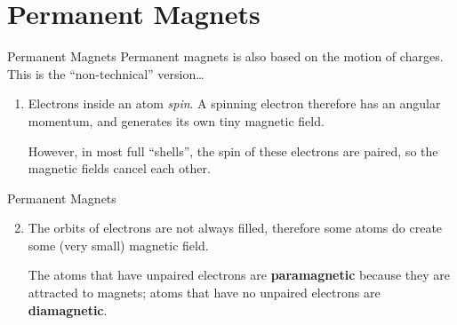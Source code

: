 \documentclass[12pt,aspectratio=169]{beamer}
\begin{document}
\section{Permanent Magnets}

\begin{frame}{Permanent Magnets}
  Permanent magnets is also based on the motion of charges. This is the
  ``non-technical'' version\ldots

  \begin{enumerate}
  \item Electrons inside an atom \emph{spin}. A spinning electron therefore has
    an angular momentum, and generates its own tiny magnetic field.
    \begin{center}
    \end{center}
    However, in most full ``shells'', the spin of these electrons are paired,
    so the magnetic fields cancel each other.
  \end{enumerate}
\end{frame}




\begin{frame}{Permanent Magnets}
  \begin{enumerate}
    \setcounter{enumi}{1}
  \item The orbits of electrons are not always filled, therefore some atoms do
    create some (very small) magnetic field.
    \begin{center}
    \end{center}
    The atoms that have unpaired electrons are \textbf{paramagnetic} because
    they are attracted to magnets; atoms that have no unpaired electrons are
    \textbf{diamagnetic}.
  \end{enumerate}
\end{frame}
\end{document}
